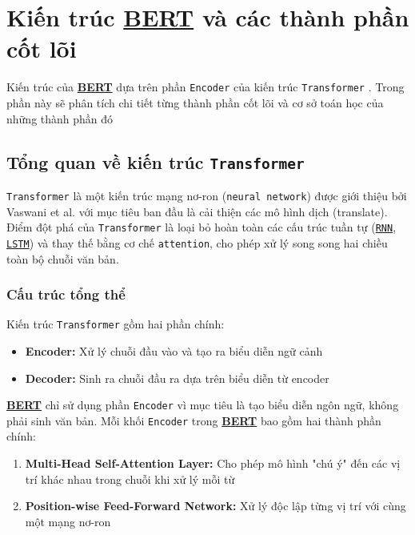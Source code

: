 \section{Kiến trúc \hyperref[acro:bert]{\textbf{BERT}} và các thành phần cốt lõi}
\label{sec:kien_truc_bert}

Kiến trúc của \hyperref[acro:bert]{\textbf{BERT}} dựa trên phần \texttt{Encoder} của kiến trúc \texttt{Transformer} \cite{vaswani2017attention}. Trong phần này sẽ phân tích chi tiết từng thành phần cốt lõi và cơ sở toán học của những thành phần đó

\subsection{Tổng quan về kiến trúc \texttt{Transformer}}
\label{ssec:tong_quan_transformer}

\texttt{Transformer} là một kiến trúc mạng nơ-ron (\texttt{neural network}) được giới thiệu bởi Vaswani et al. \cite{vaswani2017attention} với mục tiêu ban đầu là cải thiện các mô hình dịch (translate). Điểm đột phá của \texttt{Transformer} là loại bỏ hoàn toàn các cấu trúc tuần tự (\hyperref[acro:rnn]{\texttt{RNN}}, \hyperref[acro:lstm]{\texttt{LSTM}}) và thay thế bằng cơ chế \texttt{attention}, cho phép xử lý song song hai chiều toàn bộ chuỗi văn bản.

\subsubsection{Cấu trúc tổng thể}
Kiến trúc \texttt{Transformer} gồm hai phần chính:
\begin{itemize}
    \item \textbf{Encoder:} Xử lý chuỗi đầu vào và tạo ra biểu diễn ngữ cảnh
    \item \textbf{Decoder:} Sinh ra chuỗi đầu ra dựa trên biểu diễn từ encoder
\end{itemize}

\hyperref[acro:bert]{\textbf{BERT}} chỉ sử dụng phần \texttt{Encoder} vì mục tiêu là tạo biểu diễn ngôn ngữ, không phải sinh văn bản. Mỗi khối \texttt{Encoder} trong \hyperref[acro:bert]{\textbf{BERT}} bao gồm hai thành phần chính:

\begin{enumerate}
    \item \textbf{Multi-Head Self-Attention Layer:} Cho phép mô hình "chú ý" đến các vị trí khác nhau trong chuỗi khi xử lý mỗi từ
    \item \textbf{Position-wise Feed-Forward Network:} Xử lý độc lập từng vị trí với cùng một mạng nơ-ron
\end{enumerate}


